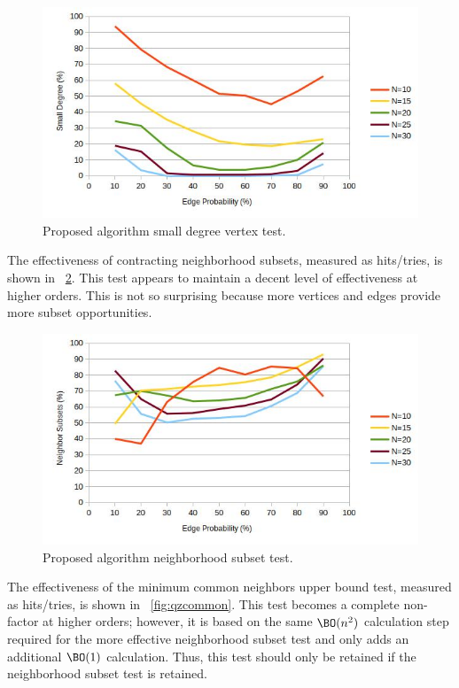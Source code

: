 \begin{figure}[H]
  \centering
  \includegraphics[width=5in]{qz_small}
  \caption{Proposed algorithm small degree vertex test.}
  \label{fig:qzsmall}
\end{figure}

The effectiveness of contracting neighborhood subsets, measured as hits/tries, is shown in
\figurename~\ref{fig:qzsubset}.  This test appears to maintain a decent level of effectiveness at higher orders.
This is not so surprising because more vertices and edges provide more subset opportunities.

\begin{figure}[H]
  \centering
  \includegraphics[width=5in]{qz_subset}
  \caption{Proposed algorithm neighborhood subset test.}
  \label{fig:qzsubset}
\end{figure}

The effectiveness of the minimum common neighbors upper bound test, measured as hits/tries, is shown in
\figurename~\ref{fig:qzcommon}.  This test becomes a complete non-factor at higher orders; however, it is based on
the same \(\BO(n^2)\) calculation step required for the more effective neighborhood subset test and only adds an
additional \(\BO(1)\) calculation.  Thus, this test should only be retained if the neighborhood subset test is
retained.

